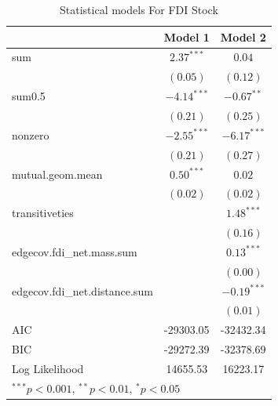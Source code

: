 \documentclass{article}
\begin{document}
\begin{table}[!htbp] 
\begin{center}
\begin{tabular}{l c c }
\hline
 & Model 1 & Model 2 \\
\hline
sum                           & $2.37^{***}$  & $0.04$        \\
                              & $(0.05)$      & $(0.12)$      \\
sum0.5                        & $-4.14^{***}$ & $-0.67^{**}$  \\
                              & $(0.21)$      & $(0.25)$      \\
nonzero                       & $-2.55^{***}$ & $-6.17^{***}$ \\
                              & $(0.21)$      & $(0.27)$      \\
mutual.geom.mean              & $0.50^{***}$  & $0.02$        \\
                              & $(0.02)$      & $(0.02)$      \\
transitiveties                &               & $1.48^{***}$  \\
                              &               & $(0.16)$      \\
edgecov.fdi\_net.mass.sum     &               & $0.13^{***}$  \\
                              &               & $(0.00)$      \\
edgecov.fdi\_net.distance.sum &               & $-0.19^{***}$ \\
                              &               & $(0.01)$      \\
\hline
AIC                           & -29303.05     & -32432.34     \\
BIC                           & -29272.39     & -32378.69     \\
Log Likelihood                & 14655.53      & 16223.17      \\
\hline
\multicolumn{3}{l}{\scriptsize{$^{***}p<0.001$, $^{**}p<0.01$, $^*p<0.05$}}
\end{tabular}
\caption{Statistical models For FDI Stock}
\label{table:coefficients}
\end{center}
\end{table}
\end{document}
